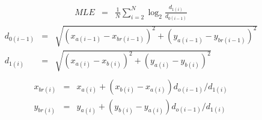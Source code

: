 \begin{eqnarray}\label{eq:Lyapunov}
    MLE &=& \frac{1}{N} \sum_{i=2}^{N} \log_2{\frac{d_{1(i)}}{d_{0(i-1)}}}
\end{eqnarray}
\begin{eqnarray}\label{eq:D0D1}
    d_{0(i-1)}&=& \sqrt{(x_{a(i-1)}-x_{br(i-1)})^2+(y_{a(i-1)}-y_{br(i-1)})^2}\nonumber\\
    d_{1(i)}&=& \sqrt{(x_{a(i)}-x_{b(i)})^2+(y_{a(i)}-y_{b(i)})^2}\\
\nonumber
\end{eqnarray}
\begin{eqnarray}\label{eq:reubicacion}
    x_{br(i)}&=& x_{a(i)}+(x_{b(i)}-x_{a(i)})d_{o(i-1)}/d_{1(i)} \nonumber\\
    y_{br(i)}&=& y_{a(i)}+(y_{b(i)}-y_{a(i)})d_{o(i-1)}/d_{1(i)}
\end{eqnarray}


